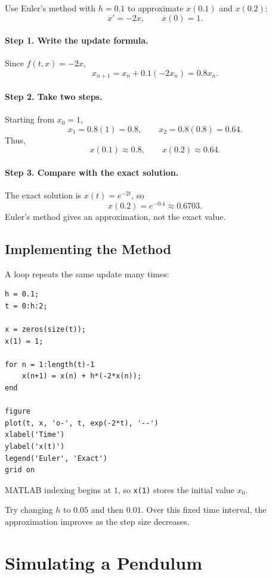\documentclass[10pt,letterpaper]{article}
\begin{document}
\begin{example}[1]{
Use Euler's method with $h=0.1$ to approximate
$x(0.1)$ and $x(0.2)$:
\[
x'=-2x,\qquad x(0)=1.
\]
}

\paragraph{Step 1. Write the update formula.}
Since $f(t,x)=-2x$,
\[
x_{n+1}=x_n+0.1(-2x_n)=0.8x_n.
\]

\paragraph{Step 2. Take two steps.}
Starting from $x_0=1$,
\[
x_1=0.8(1)=0.8,
\qquad
x_2=0.8(0.8)=0.64.
\]
Thus,
\[
\boxed{x(0.1)\approx0.8,\qquad x(0.2)\approx0.64.}
\]

\paragraph{Step 3. Compare with the exact solution.}
The exact solution is $x(t)=e^{-2t}$, so
\[
x(0.2)=e^{-0.4}\approx0.6703.
\]
Euler's method gives an approximation, not the exact value.
\end{example}

\subsection{Implementing the Method}

A loop repeats the same update many times:

\begin{lstlisting}[style=lecturematlab]
h = 0.1;
t = 0:h:2;

x = zeros(size(t));
x(1) = 1;

for n = 1:length(t)-1
    x(n+1) = x(n) + h*(-2*x(n));
end

figure
plot(t, x, 'o-', t, exp(-2*t), '--')
xlabel('Time')
ylabel('x(t)')
legend('Euler', 'Exact')
grid on
\end{lstlisting}

MATLAB indexing begins at $1$, so \texttt{x(1)}
stores the initial value $x_0$.

Try changing $h$ to $0.05$ and then $0.01$.
Over this fixed time interval, the approximation
improves as the step size decreases.

\section{Simulating a Pendulum}
\end{document}
